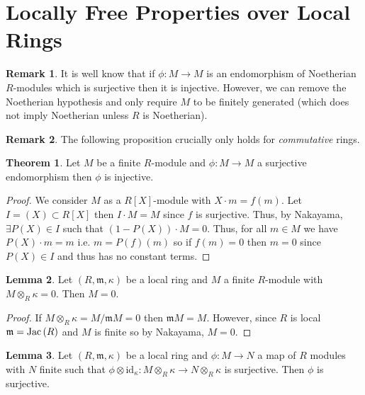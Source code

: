\documentclass[12pt]{extarticle}
\newcommand{\id}{\mathrm{id}}
\theoremstyle{definition}
\newtheorem{theorem}{Theorem}[section]
\newtheorem{lemma}[theorem]{Lemma}
\newtheorem{remark}{Remark}
\newcommand{\m}{\mathfrak{m}}
\begin{document}
\section{Locally Free Properties over Local Rings}

\begin{remark}
It is well know that if $\phi : M \to M$ is an endomorphism of Noetherian $R$-modules which is surjective then it is injective. However, we can remove the Noetherian hypothesis and only require $M$ to be finitely generated (which does not imply Noetherian unless $R$ is Noetherian). 
\end{remark}

\begin{remark}
The following proposition crucially only holds for \textit{commutative} rings.  
\end{remark}

\begin{theorem}
Let $M$ be a finite $R$-module and $\phi : M \to M$ a surjective endomorphism then $\phi$ is injective.
\end{theorem}

\begin{proof}
We consider $M$ as a $R[X]$-module with $X \cdot m  = f(m)$. Let $I = (X) \subset R[X]$ then $I \cdot M = M$ since $f$ is surjective. Thus, by Nakayama, $\exists P(X) \in I$ such that $(1 - P(X)) \cdot M = 0$. Thus, for all $m \in M$ we have $P(X) \cdot m = m$ i.e. $m = P(f)(m)$ so if $f(m) = 0$ then $m = 0$ since $P(X) \in I$ and thus has no constant terms.
\end{proof}

\begin{lemma}
Let $(R, \m, \kappa)$ be a local ring and $M$ a finite $R$-module with $M \otimes_R \kappa = 0$. Then $M = 0$.
\end{lemma}

\begin{proof}
If $M \otimes_R \kappa = M / \m M = 0$ then $\m M = M$. However, since $R$ is local $\m = \Jac{R}$ and $M$ is finite so by Nakayama, $M = 0$.
\end{proof}

\begin{lemma}
Let $(R, \m, \kappa)$ be a local ring and $\phi : M \to N$ a map of $R$ modules with $N$ finite such that $\phi \otimes \id_\kappa : M \otimes_R \kappa \to N \otimes_R \kappa$ is surjective. Then $\phi$ is surjective.
\end{lemma}
\end{document}
